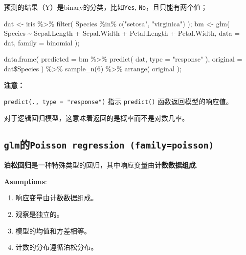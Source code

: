 \documentclass[
]{article}
\newenvironment{Shaded}{}{}
\newcommand{\AttributeTok}[1]{\textcolor[rgb]{0.49,0.56,0.16}{#1}}
\newcommand{\DecValTok}[1]{\textcolor[rgb]{0.25,0.63,0.44}{#1}}
\newcommand{\FunctionTok}[1]{\textcolor[rgb]{0.02,0.16,0.49}{#1}}
\newcommand{\NormalTok}[1]{#1}
\newcommand{\OtherTok}[1]{\textcolor[rgb]{0.00,0.44,0.13}{#1}}
\newcommand{\SpecialCharTok}[1]{\textcolor[rgb]{0.25,0.44,0.63}{#1}}
\newcommand{\StringTok}[1]{\textcolor[rgb]{0.25,0.44,0.63}{#1}}
\begin{document}
预测的结果（Y）是binary的分类，比如\texttt{Yes},
\texttt{No}，且只能有两个值；

\begin{Shaded}
\begin{Highlighting}[]
\NormalTok{dat }\OtherTok{\textless{}{-}}\NormalTok{ iris }\SpecialCharTok{\%\textgreater{}\%} \FunctionTok{filter}\NormalTok{( Species }\SpecialCharTok{\%in\%} \FunctionTok{c}\NormalTok{(}\StringTok{"setosa"}\NormalTok{, }\StringTok{"virginica"}\NormalTok{) );}
\NormalTok{bm }\OtherTok{\textless{}{-}} \FunctionTok{glm}\NormalTok{( Species }\SpecialCharTok{\textasciitilde{}}\NormalTok{ Sepal.Length }\SpecialCharTok{+}\NormalTok{ Sepal.Width }\SpecialCharTok{+}\NormalTok{ Petal.Length }\SpecialCharTok{+}\NormalTok{ Petal.Width, }
           \AttributeTok{data =}\NormalTok{ dat, }\AttributeTok{family =}\NormalTok{ binomial );}

\FunctionTok{data.frame}\NormalTok{( }\AttributeTok{predicted =}\NormalTok{ bm }\SpecialCharTok{\%\textgreater{}\%} \FunctionTok{predict}\NormalTok{( dat, }\AttributeTok{type =} \StringTok{"response"}\NormalTok{ ),}
            \AttributeTok{original =}\NormalTok{ dat}\SpecialCharTok{\$}\NormalTok{Species ) }\SpecialCharTok{\%\textgreater{}\%} \FunctionTok{sample\_n}\NormalTok{(}\DecValTok{6}\NormalTok{) }\SpecialCharTok{\%\textgreater{}\%} \FunctionTok{arrange}\NormalTok{( original );}
\end{Highlighting}
\end{Shaded}

\textbf{注意：}

\texttt{predict(.,\ type\ =\ "response")} 指示 \texttt{predict()}
函数返回模型的响应值。

对于逻辑回归模型，这意味着返回的是概率而不是对数几率。

\hypertarget{glmux7684poisson-regression-familypoisson}{%
\subsection{\texorpdfstring{\texttt{glm}的\texttt{Poisson\ regression\ (family=poisson)}}{glm的Poisson regression (family=poisson)}}\label{glmux7684poisson-regression-familypoisson}}

\textbf{泊松回归}是一种特殊类型的回归，其中响应变量由\textbf{计数数据组成}.

\textbf{Asumptions}:

\begin{enumerate}
\def\labelenumi{\arabic{enumi}.}
\item
  响应变量由计数数据组成。
\item
  观察是独立的。
\item
  模型的均值和方差相等。
\item
  计数的分布遵循泊松分布。
\end{enumerate}
\end{document}
